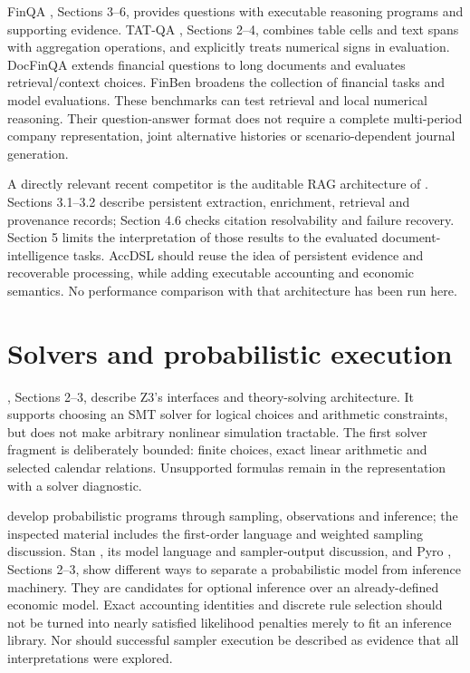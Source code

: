 FinQA \citep{chen2021}, Sections 3--6, provides questions with executable
reasoning programs and supporting evidence. TAT-QA \citep{zhu2021}, Sections
2--4, combines table cells and text spans with aggregation operations, and
explicitly treats numerical signs in evaluation. DocFinQA \citep{reddy2024}
extends financial questions to long documents and evaluates retrieval/context
choices. FinBen \citep{xie2024} broadens the collection of financial tasks and
model evaluations. These benchmarks can test retrieval and local numerical
reasoning. Their question-answer format does not require a complete
multi-period company representation, joint alternative histories or
scenario-dependent journal generation.

A directly relevant recent competitor is the auditable RAG architecture of
\citet{cosentino2026}. Sections 3.1--3.2 describe persistent extraction,
enrichment, retrieval and provenance records; Section 4.6 checks citation
resolvability and failure recovery. Section 5 limits the interpretation of
those results to the evaluated document-intelligence tasks. AccDSL should
reuse the idea of persistent evidence and recoverable processing, while adding
executable accounting and economic semantics. No performance comparison with
that architecture has been run here.

\section{Solvers and probabilistic execution}

\citet{damoura2008}, Sections 2--3, describe Z3's interfaces and theory-solving
architecture. It supports choosing an SMT solver for logical choices and
arithmetic constraints, but does not make arbitrary nonlinear simulation
tractable. The first solver fragment is deliberately bounded: finite choices,
exact linear arithmetic and selected calendar relations. Unsupported formulas
remain in the representation with a solver diagnostic.

\citet{vandeMeent2018} develop probabilistic programs through sampling,
observations and inference; the inspected material includes the first-order
language and weighted sampling discussion. Stan \citep{carpenter2017}, its
model language and sampler-output discussion, and Pyro \citep{bingham2019},
Sections 2--3, show different ways to separate a probabilistic model from
inference machinery. They are candidates for optional inference over an
already-defined economic model. Exact accounting identities and discrete rule
selection should not be turned into nearly satisfied likelihood penalties
merely to fit an inference library. Nor should successful sampler execution
be described as evidence that all interpretations were explored.

